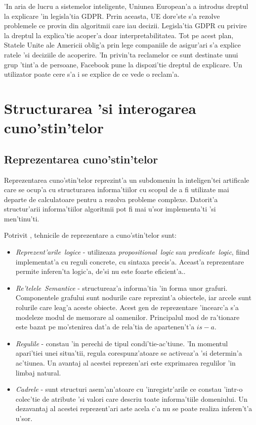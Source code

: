 \documentclass[12pt,a4paper,twoside]{report}
\begin{document}
'In aria de lucru a sistemelor inteligente, Uniunea European'a a introdus dreptul la explicare 'in legisla'tia GDPR. Prrin aceasta, UE dore'ste s'a rezolve problemele ce provin din algoritmii care iau decizii. Legisla'tia GDPR cu privire la dreptul la explica'tie acoper'a doar interpretabilitatea. Tot pe acest plan, Statele Unite ale Americii oblig'a prin lege companiile de asigur'ari s'a explice ratele 'si deciziile de acoperire. 'In privin'ta reclamelor ce sunt destinate unui grup 'tint'a de persoane, Facebook pune la dispozi'tie dreptul de explicare. Un utilizator poate cere s'a i se explice de ce vede o reclam'a.



\section{Structurarea 'si interogarea cuno'stin'telor}


\subsection{Reprezentarea cuno'stin'telor}

Reprezentarea cuno'stin'telor reprezint'a un subdomeniu la inteligen'tei artificale care se ocup'a cu structurarea informa'tiilor cu scopul de a fi utilizate mai departe de calculatoare pentru a rezolva probleme complexe. Datorit'a structur'arii informa'tiilor algoritmii pot fi mai u'sor implementa'ti 'si men'tinu'ti.

Potrivit \cite{SharmaATechniques},\cite{javap_kr} tehnicile de reprezentare a cuno'stin'telor sunt: 

\begin{itemize}
    \item {\it Reprezent'arile\ logice} - utilizeaza {\it propositional\ logic} sau {\it predicate\ logic}, fiind implementat'a cu reguli concrete, cu sintaxa precis'a. Aceast'a reprezentare permite inferen'ta logic'a, de'si nu este foarte eficient'a.. 
    \item {\it Re'telele\ Semantice} - structureaz'a informa'tia  'in forma unor grafuri. Componentele grafului sunt nodurile care reprezint'a obiectele, iar arcele sunt rolurile care leag'a aceste obiecte. Acest gen de reprezentare 'incearc'a s'a modeleze modul de memorare al oamenilor. Principalul mod de ra'tionare este bazat pe mo'stenirea dat'a de rela'tia de apartenen't'a $is-a$.
    \item {\it Regulile} - constau 'in perechi de tipul condi'tie-ac'tiune. 'In momentul apari'tiei unei situa'tii, regula corespunz'atoare se activeaz'a 'si determin'a ac'tiunea. Un avantaj al acestei reprezen'ari este exprimarea regulilor 'in limbaj natural.
    \item {\it Cadrele} - sunt structuri asem'an'atoare cu 'inregistr'arile ce constau 'intr-o colec'tie de atribute 'si valori care descriu toate informa'tiile domeniului. Un dezavantaj al acestei reprezent'ari aste acela c'a nu se poate realiza inferen't'a u'sor.
\end{itemize}
\end{document}

